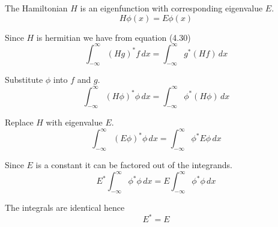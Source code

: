 


\bigskip
The Hamiltonian $H$ is an eigenfunction with corresponding eigenvalue $E$.
\begin{equation*}
H\phi(x)=E\phi(x)
\tag{4.42}
\end{equation*}

Since $H$ is hermitian we have from equation (4.30)
\begin{equation*}
\int_{-\infty}^\infty(Hg)^*f\,dx=\int_{-\infty}^\infty g^*(Hf)\,dx
\tag{4.30}
\end{equation*}

Substitute $\phi$ into $f$ and $g$.
\begin{equation*}
\int_{-\infty}^\infty(H\phi)^*\phi\,dx=\int_{-\infty}^\infty \phi^*(H\phi)\,dx
\end{equation*}

Replace $H$ with eigenvalue $E$.
\begin{equation*}
\int_{-\infty}^\infty (E\phi)^*\phi\,dx=\int_{-\infty}^\infty \phi^*E\phi\,dx
\end{equation*}

Since $E$ is a constant it can be factored out of the integrands.
\begin{equation*}
E^*\int_{-\infty}^\infty\phi^*\phi\,dx=E\int_{-\infty}^\infty \phi^*\phi\,dx
\end{equation*}

The integrals are identical hence
\begin{equation*}
E^*=E
\end{equation*}


